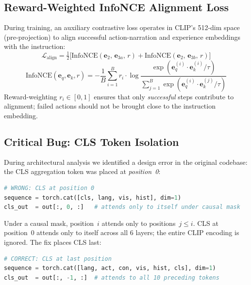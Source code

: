 \documentclass{article}
\begin{document}
\subsection{Reward-Weighted InfoNCE Alignment Loss}
\label{sec:alignment}

During training, an auxiliary contrastive loss operates in CLIP's 512-dim
space (pre-projection) to align successful action-narration and experience
embeddings with the instruction:
\begin{equation}
  \mathcal{L}_{\mathrm{align}}
  = \tfrac{1}{2}\bigl[
    \mathrm{InfoNCE}(\mathbf{e}_2,\,\mathbf{e}_{3a},\,r)
    +
    \mathrm{InfoNCE}(\mathbf{e}_2,\,\mathbf{e}_{3b},\,r)
  \bigr]
  \label{eq:align}
\end{equation}
\begin{equation}
  \mathrm{InfoNCE}(\mathbf{e}_q,\mathbf{e}_k,r)
  = -\frac{1}{B}\sum_{i=1}^{B}r_i\cdot
    \log\frac{\exp(\mathbf{e}_q^{(i)}\cdot\mathbf{e}_k^{(i)}/\tau)}
             {\sum_{j=1}^{B}\exp(\mathbf{e}_q^{(i)}\cdot\mathbf{e}_k^{(j)}/\tau)}
  \label{eq:infonce}
\end{equation}
Reward-weighting $r_i\!\in\![0,1]$ ensures that only \emph{successful}
steps contribute to alignment; failed actions should not be brought close
to the instruction embedding.

\subsection{Critical Bug: CLS Token Isolation}
\label{sec:bug}

During architectural analysis we identified a design error in the original
codebase: the CLS aggregation token was placed at \emph{position~0}:

\begin{lstlisting}[language=Python]
# WRONG: CLS at position 0
sequence = torch.cat([cls, lang, vis, hist], dim=1)
cls_out  = out[:, 0, :]   # attends only to itself under causal mask
\end{lstlisting}

Under a causal mask, position~$i$ attends only to positions~$j\leq i$.
CLS at position~0 attends only to itself across all 6 layers; the entire
CLIP encoding is ignored.
The fix places CLS last:

\begin{lstlisting}[language=Python]
# CORRECT: CLS at last position
sequence = torch.cat([lang, act, con, vis, hist, cls], dim=1)
cls_out  = out[:, -1, :]  # attends to all 10 preceding tokens
\end{lstlisting}
\end{document}
